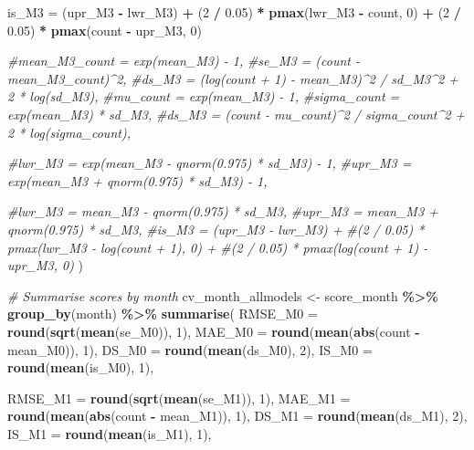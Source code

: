\documentclass[
]{article}
\newenvironment{Shaded}{\begin{snugshade}}{\end{snugshade}}
\newcommand{\AttributeTok}[1]{\textcolor[rgb]{0.13,0.29,0.53}{#1}}
\newcommand{\CommentTok}[1]{\textcolor[rgb]{0.56,0.35,0.01}{\textit{#1}}}
\newcommand{\DecValTok}[1]{\textcolor[rgb]{0.00,0.00,0.81}{#1}}
\newcommand{\FloatTok}[1]{\textcolor[rgb]{0.00,0.00,0.81}{#1}}
\newcommand{\FunctionTok}[1]{\textcolor[rgb]{0.13,0.29,0.53}{\textbf{#1}}}
\newcommand{\NormalTok}[1]{#1}
\newcommand{\OtherTok}[1]{\textcolor[rgb]{0.56,0.35,0.01}{#1}}
\newcommand{\SpecialCharTok}[1]{\textcolor[rgb]{0.81,0.36,0.00}{\textbf{#1}}}
\begin{document}
\begin{Shaded}
\begin{Highlighting}[]
    \AttributeTok{is\_M3  =}\NormalTok{ (upr\_M3 }\SpecialCharTok{{-}}\NormalTok{ lwr\_M3) }\SpecialCharTok{+}
\NormalTok{      (}\DecValTok{2} \SpecialCharTok{/} \FloatTok{0.05}\NormalTok{) }\SpecialCharTok{*} \FunctionTok{pmax}\NormalTok{(lwr\_M3 }\SpecialCharTok{{-}}\NormalTok{ count, }\DecValTok{0}\NormalTok{) }\SpecialCharTok{+}
\NormalTok{      (}\DecValTok{2} \SpecialCharTok{/} \FloatTok{0.05}\NormalTok{) }\SpecialCharTok{*} \FunctionTok{pmax}\NormalTok{(count }\SpecialCharTok{{-}}\NormalTok{ upr\_M3, }\DecValTok{0}\NormalTok{)}
    
    
    \CommentTok{\#mean\_M3\_count = exp(mean\_M3) {-} 1,}
    \CommentTok{\#se\_M3 = (count {-} mean\_M3\_count)\^{}2,}
    \CommentTok{\#ds\_M3 = (log(count + 1) {-} mean\_M3)\^{}2 / sd\_M3\^{}2 + 2 * log(sd\_M3),}
    \CommentTok{\#mu\_count    = exp(mean\_M3) {-} 1,}
    \CommentTok{\#sigma\_count = exp(mean\_M3) * sd\_M3,}
    \CommentTok{\#ds\_M3 = (count {-} mu\_count)\^{}2 / sigma\_count\^{}2 + 2 * log(sigma\_count),}
    
    \CommentTok{\#lwr\_M3 = exp(mean\_M3 {-} qnorm(0.975) * sd\_M3) {-} 1,}
    \CommentTok{\#upr\_M3 = exp(mean\_M3 + qnorm(0.975) * sd\_M3) {-} 1,}
    
    \CommentTok{\#lwr\_M3 = mean\_M3 {-} qnorm(0.975) * sd\_M3,}
    \CommentTok{\#upr\_M3 = mean\_M3 + qnorm(0.975) * sd\_M3,}
    \CommentTok{\#is\_M3 = (upr\_M3 {-} lwr\_M3) +}
      \CommentTok{\#(2 / 0.05) * pmax(lwr\_M3 {-} log(count + 1), 0) +}
      \CommentTok{\#(2 / 0.05) * pmax(log(count + 1) {-} upr\_M3, 0)}
\NormalTok{  )}

\CommentTok{\# Summarise scores by month}
\NormalTok{cv\_month\_allmodels }\OtherTok{\textless{}{-}}\NormalTok{ score\_month }\SpecialCharTok{\%\textgreater{}\%}
  \FunctionTok{group\_by}\NormalTok{(month) }\SpecialCharTok{\%\textgreater{}\%}
  \FunctionTok{summarise}\NormalTok{(}
    \AttributeTok{RMSE\_M0 =} \FunctionTok{round}\NormalTok{(}\FunctionTok{sqrt}\NormalTok{(}\FunctionTok{mean}\NormalTok{(se\_M0)), }\DecValTok{1}\NormalTok{),}
    \AttributeTok{MAE\_M0  =} \FunctionTok{round}\NormalTok{(}\FunctionTok{mean}\NormalTok{(}\FunctionTok{abs}\NormalTok{(count }\SpecialCharTok{{-}}\NormalTok{ mean\_M0)), }\DecValTok{1}\NormalTok{),}
    \AttributeTok{DS\_M0   =} \FunctionTok{round}\NormalTok{(}\FunctionTok{mean}\NormalTok{(ds\_M0), }\DecValTok{2}\NormalTok{),}
    \AttributeTok{IS\_M0   =} \FunctionTok{round}\NormalTok{(}\FunctionTok{mean}\NormalTok{(is\_M0), }\DecValTok{1}\NormalTok{),}
    
    \AttributeTok{RMSE\_M1 =} \FunctionTok{round}\NormalTok{(}\FunctionTok{sqrt}\NormalTok{(}\FunctionTok{mean}\NormalTok{(se\_M1)), }\DecValTok{1}\NormalTok{),}
    \AttributeTok{MAE\_M1  =} \FunctionTok{round}\NormalTok{(}\FunctionTok{mean}\NormalTok{(}\FunctionTok{abs}\NormalTok{(count }\SpecialCharTok{{-}}\NormalTok{ mean\_M1)), }\DecValTok{1}\NormalTok{),}
    \AttributeTok{DS\_M1   =} \FunctionTok{round}\NormalTok{(}\FunctionTok{mean}\NormalTok{(ds\_M1), }\DecValTok{2}\NormalTok{),}
    \AttributeTok{IS\_M1   =} \FunctionTok{round}\NormalTok{(}\FunctionTok{mean}\NormalTok{(is\_M1), }\DecValTok{1}\NormalTok{),}
    

\end{Highlighting}
\end{Shaded}
\end{document}
